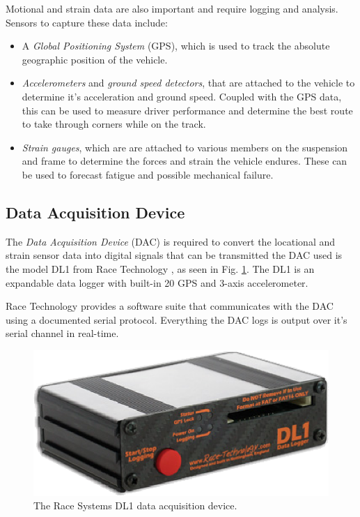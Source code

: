 Motional and strain data are also important and require logging and analysis. Sensors to capture these data include:

\begin{itemize}

\item A \emph{Global Positioning System} (GPS), which is used to track the absolute geographic position of the vehicle. 

\item \emph{Accelerometers} and \emph{ground speed detectors}, that are attached to the vehicle to determine it's acceleration and ground speed. Coupled with the GPS data, this can be used to measure driver performance and determine the best route to take through corners while on the track.

\item \emph{Strain gauges}, which are are attached to various members on the suspension and frame to determine the forces and strain the vehicle endures. These can be used to forecast fatigue and possible mechanical failure. 

\end{itemize}

\subsection{Data Acquisition Device}

The \emph{Data Acquisition Device} (DAC) is required to convert the locational and strain sensor data into digital signals that can be transmitted  the DAC used is the model DL1 from Race Technology \cite{DL1Dsheet}, as seen in Fig. \ref{fig:dl1_product}. The DL1 is an expandable data logger with built-in \unit{20}{\hertz} GPS and 3-axis accelerometer. 

Race Technology provides a software suite that communicates with the DAC using a documented serial protocol. Everything the DAC logs is output over it's serial channel in real-time.

\begin{figure}[H]
	\centering
		\includegraphics[scale=0.5]{background/figures/dl1.eps}
	\caption{The Race Systems DL1 data acquisition device.}
	\label{fig:dl1_product}
\end{figure}

